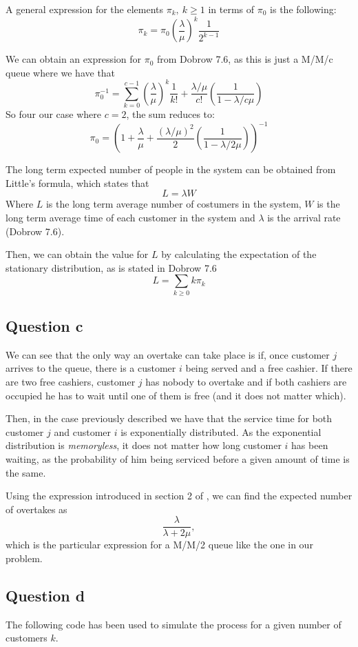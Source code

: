 \documentclass[11pt, a4paper]{article}
\begin{document}
A general expression for the elements $\pi_k, \ k\geq 1$ in terms of $\pi_0$ is the following:
\[
	\pi_k = \pi_0\left(\frac{\lambda}{\mu}\right)^k \frac{1}{2^{k-1}}
\]

We can obtain an expression for $\pi_0$ from Dobrow 7.6, as this is just a M/M/c queue where we have that
\[
	\pi_0^{-1} = \sum_{k=0}^{c-1} \left(\frac{\lambda}{\mu}\right)^k \frac{1}{k!} + \frac{\lambda / \mu}{c!} \left(\frac{1}{1 - \lambda/c\mu}\right)
\]
So four our case where $c=2$, the sum reduces to:
\[
	\pi_0 = \left(1 + \frac{\lambda}{\mu} + \frac{(\lambda/\mu)^2}{2}\left(\frac{1}{1 - \lambda/2\mu}\right)\right)^{-1}
\]

The long term expected number of people in the system can be obtained from Little's formula, which states that 
\[
	L = \lambda W
\]
Where $L$ is the long term average number of costumers in the system, $W$ is the long term average time of each customer in the system and $\lambda$ is the arrival rate (Dobrow 7.6).

Then, we can obtain the value for $L$ by calculating the expectation of the stationary distribution, as is stated in Dobrow 7.6
\[
	 L = \sum_{k \geq 0} k\pi_k
\]
\subsection*{Question c}
We can see that the only way an overtake can take place is if, once customer $j$ arrives to the queue, there is a customer $i$ being served and a free cashier. 
If there are two free cashiers, customer $j$ has nobody to overtake and if both cashiers are occupied he has to wait until one of them is free (and it does not matter which).

Then, in the case previously described we have that the service time for both customer $j$ and customer $i$ is exponentially distributed. As the exponential distribution is \emph{memoryless}, it does not matter how long customer $i$ has been waiting, as the probability of him being serviced before a given amount of time is the same.

Using the expression introduced in section 2 of \cite{baumann2018number}, we can find the expected number of overtakes as
\[
	\frac{\lambda}{\lambda + 2\mu},
\]
which is the particular expression for a M/M/2 queue like the one in our problem.

\subsection*{Question d}
The following code has been used to simulate the process for a given number of customers $k$.
\end{document}
